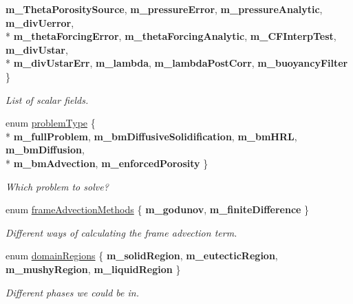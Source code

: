 \begin{DoxyCompactItemize}
{\bfseries m\-\_\-\-Theta\-Porosity\-Source}, 
{\bfseries m\-\_\-pressure\-Error}, 
{\bfseries m\-\_\-pressure\-Analytic}, 
{\bfseries m\-\_\-div\-Uerror}, 
\\*
{\bfseries m\-\_\-theta\-Forcing\-Error}, 
{\bfseries m\-\_\-theta\-Forcing\-Analytic}, 
{\bfseries m\-\_\-\-C\-F\-Interp\-Test}, 
{\bfseries m\-\_\-div\-Ustar}, 
\\*
{\bfseries m\-\_\-div\-Ustar\-Err}, 
{\bfseries m\-\_\-lambda}, 
{\bfseries m\-\_\-lambda\-Post\-Corr}, 
{\bfseries m\-\_\-buoyancy\-Filter}
 \}
\begin{DoxyCompactList}\small\item\em List of scalar fields. \end{DoxyCompactList}\item 
enum \hyperlink{classamr_mushy_layer_aa2979f33ff164690d99ca7f334c49ac7}{problem\-Type} \{ \\*
{\bfseries m\-\_\-full\-Problem}, 
{\bfseries m\-\_\-bm\-Diffusive\-Solidification}, 
{\bfseries m\-\_\-bm\-H\-R\-L}, 
{\bfseries m\-\_\-bm\-Diffusion}, 
\\*
{\bfseries m\-\_\-bm\-Advection}, 
{\bfseries m\-\_\-enforced\-Porosity}
 \}
\begin{DoxyCompactList}\small\item\em Which problem to solve? \end{DoxyCompactList}\item 
enum \hyperlink{classamr_mushy_layer_abd7c190080fa5c06b3587aae34a2af94}{frame\-Advection\-Methods} \{ {\bfseries m\-\_\-godunov}, 
{\bfseries m\-\_\-finite\-Difference}
 \}
\begin{DoxyCompactList}\small\item\em Different ways of calculating the frame advection term. \end{DoxyCompactList}\item 
enum \hyperlink{classamr_mushy_layer_a9ff26f4fd929196eb797c70e9a27d0d5}{domain\-Regions} \{ {\bfseries m\-\_\-solid\-Region}, 
{\bfseries m\-\_\-eutectic\-Region}, 
{\bfseries m\-\_\-mushy\-Region}, 
{\bfseries m\-\_\-liquid\-Region}
 \}
\begin{DoxyCompactList}\small\item\em Different phases we could be in. \end{DoxyCompactList}\end{DoxyCompactItemize}
